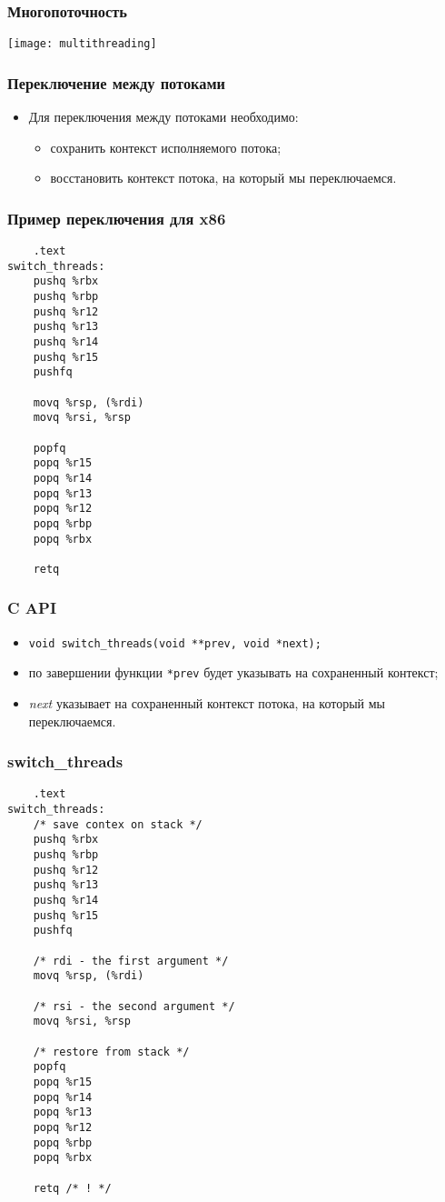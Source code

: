 \begin{frame}
\frametitle{Многопоточность}
\texttt{[image: multithreading]}
\end{frame}

\begin{frame}
\frametitle{Переключение между потоками}
\begin{itemize}
    \item<1->Для переключения между потоками необходимо:
    \begin{itemize}
        \item<2->сохранить контекст исполняемого потока;
        \item<3->восстановить контекст потока, на который мы переключаемся.
    \end{itemize}
\end{itemize}
\end{frame}

\begin{frame}[fragile]
\frametitle{Пример переключения для x86}
\begin{lstlisting}
    .text
switch_threads:
    pushq %rbx
    pushq %rbp
    pushq %r12
    pushq %r13
    pushq %r14
    pushq %r15
    pushfq

    movq %rsp, (%rdi)
    movq %rsi, %rsp

    popfq
    popq %r15
    popq %r14
    popq %r13
    popq %r12
    popq %rbp
    popq %rbx

    retq
\end{lstlisting}
\end{frame}

\begin{frame}[fragile]
\frametitle{C API}
\begin{itemize}
    \item \lstinline|void switch_threads(void **prev, void *next);|
    \item<1->по завершении функции \lstinline|*prev| будет указывать
             на сохраненный контекст;
    \item<2->\emph{next} указывает на сохраненный контекст потока, на
             который мы переключаемся.
\end{itemize}
\end{frame}

\begin{frame}[fragile]
\frametitle{switch\_threads}
\begin{lstlisting}
    .text
switch_threads:
    /* save contex on stack */
    pushq %rbx
    pushq %rbp
    pushq %r12
    pushq %r13
    pushq %r14
    pushq %r15
    pushfq

    /* rdi - the first argument */
    movq %rsp, (%rdi)

    /* rsi - the second argument */
    movq %rsi, %rsp

    /* restore from stack */
    popfq
    popq %r15
    popq %r14
    popq %r13
    popq %r12
    popq %rbp
    popq %rbx

    retq /* ! */
\end{lstlisting}
\end{frame}

